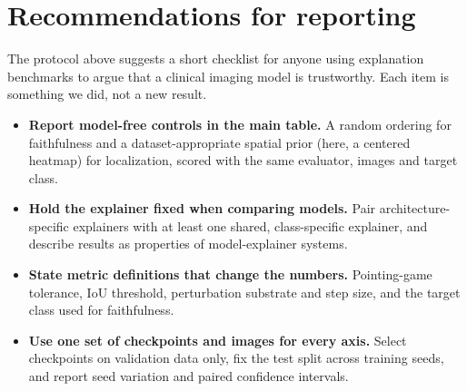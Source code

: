 \section{Recommendations for reporting}
\label{sec:recommendations}
The protocol above suggests a short checklist for anyone using explanation benchmarks to argue that a
clinical imaging model is trustworthy. Each item is something we did, not a new result.
\begin{itemize}
\item \textbf{Report model-free controls in the main table.} A random ordering for faithfulness and a
  dataset-appropriate spatial prior (here, a centered heatmap) for localization, scored with the same
  evaluator, images and target class.
\item \textbf{Hold the explainer fixed when comparing models.} Pair architecture-specific explainers with at
  least one shared, class-specific explainer, and describe results as properties of model-explainer systems.
\item \textbf{State metric definitions that change the numbers.} Pointing-game tolerance, IoU threshold,
  perturbation substrate and step size, and the target class used for faithfulness.
\item \textbf{Use one set of checkpoints and images for every axis.} Select checkpoints on validation data
  only, fix the test split across training seeds, and report seed variation and paired confidence intervals.
\end{itemize}
